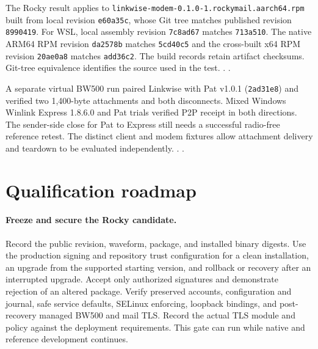 The Rocky result applies to \texttt{linkwise-modem-0.1.0-1.rockymail.aarch64.rpm}
built from local revision \texttt{e60a35c}, whose Git tree matches
published revision \texttt{8990419}. For WSL, local assembly revision
\texttt{7c8ad67} matches \texttt{713a510}. The native ARM64 RPM revision
\texttt{da2578b} matches \texttt{5cd40c5} and the cross-built x64 RPM
revision \texttt{20ae0a8} matches \texttt{add36c2}. The build records
retain artifact checksums. Git-tree equivalence identifies the source
used in the test.
.
.

A separate virtual BW500 run paired Linkwise with Pat v1.0.1
(\texttt{2ad31e8}) and verified two 1,400-byte attachments and both
disconnects. Mixed Windows Winlink Express 1.8.6.0 and Pat trials
verified P2P receipt in both directions. The sender-side close for Pat
to Express still needs a successful radio-free reference retest. The distinct
client and modem fixtures allow attachment delivery and teardown to
be evaluated independently.
.
.

\section{Qualification roadmap}\label{sec:roadmap}

\paragraph{Freeze and secure the Rocky candidate.}
Record the public revision, waveform, package, and installed binary
digests. Use the production signing and repository trust configuration
for a clean installation, an upgrade from the supported starting
version, and rollback or recovery after an interrupted upgrade.
Accept only authorized signatures and demonstrate rejection of an
altered package. Verify preserved accounts, configuration and journal,
safe service defaults, SELinux enforcing, loopback bindings, and
post-recovery managed BW500 and mail TLS. Record the actual TLS module
and policy against the deployment requirements. This gate can run
while native and reference development continues.

